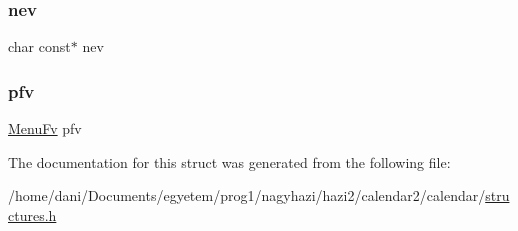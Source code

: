 \subsubsection{\texorpdfstring{nev}{nev}}
{\footnotesize\ttfamily char const$\ast$ nev}

\mbox{\label{struct_menu_pont_a3b19ca5c366ddc663cb0c6d05ad580ad}} 
\subsubsection{\texorpdfstring{pfv}{pfv}}
{\footnotesize\ttfamily \hyperlink{structures_8h_aa04041873905737ffeb12c611f7c5bde}{Menu\+Fv} pfv}



The documentation for this struct was generated from the following file\+:\begin{DoxyCompactItemize}
\item 
/home/dani/\+Documents/egyetem/prog1/nagyhazi/hazi2/calendar2/calendar/\hyperlink{structures_8h}{structures.\+h}\end{DoxyCompactItemize}
